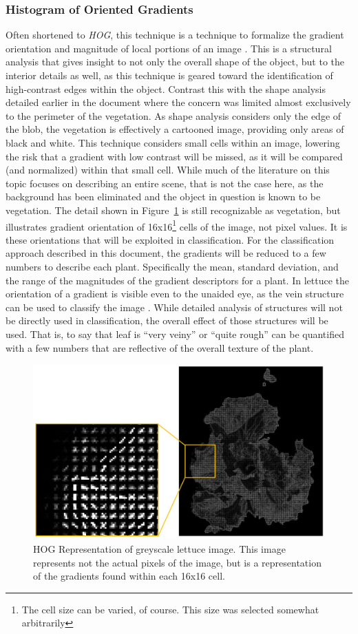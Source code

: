 \documentclass[letterpaper]{article}
\begin{document}
{\subsubsection{Histogram of Oriented Gradients}
Often shortened to \textit{HOG}, this technique is a technique to formalize the gradient orientation and magnitude of local portions of an image \parencite[p.~155]{Forsyth2012-hy}. This is a structural analysis that gives insight to not only the overall shape of the object, but to the interior details as well, as this technique is geared toward the identification of high-contrast edges within the object. Contrast this with the shape analysis detailed earlier in the document where the concern was limited almost exclusively to the perimeter of the vegetation.  As shape analysis considers only the edge of the blob, the vegetation is effectively a cartooned image, providing only areas of black and white. This technique considers small cells within an image, lowering the risk that a gradient with low contrast will be missed, as it will be compared (and normalized) within that small cell. While much of the literature on this topic focuses on describing an entire scene, that is not the case here, as the background has been eliminated and the object in question is known to be vegetation.
The detail shown in Figure~\ref{fig:hog} is still recognizable as vegetation, but illustrates gradient orientation of 16x16\footnote{The cell size can be varied, of course. This size was selected somewhat arbitrarily} cells of the image, not pixel values. It is these orientations that will be exploited in classification.  For the classification approach described in this document, the gradients will be reduced to a few numbers to describe each plant. Specifically the mean, standard deviation, and the range of the magnitudes of the gradient descriptors for a plant. In lettuce the orientation of a gradient is visible even to the unaided eye, as the vein structure can be used to classify the image \parencite{Elhariri2014-eo}. While detailed analysis of structures will not be directly used in classification, the overall effect of those structures will be used. That is, to say that leaf is ``very veiny'' or ``quite rough'' can be quantified with a few numbers that are reflective of the overall texture of the plant.
\begin{figure}[H]
	\centering
	\includegraphics[width=0.4\linewidth]{./figures/hog.jpg}
	\caption[HOG Representation of Lettuce]{HOG Representation of greyscale lettuce image. This image represents not the actual pixels of the image, but is a representation of the gradients found within each 16x16 cell.}
	\label{fig:hog}
\end{figure}

}
\end{document}
